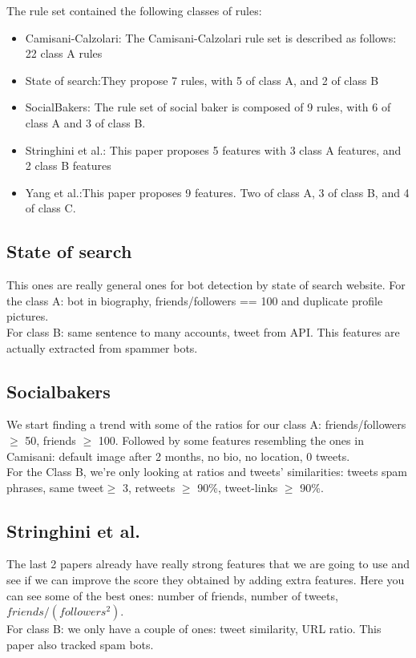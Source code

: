 \documentclass[a4paper,11pt]{article}
\begin{document}
The rule set contained the following classes of rules:

\begin{itemize}
\item Camisani-Calzolari: The Camisani-Calzolari rule set is described as follows: 22 class A rules
\item State of search:They propose 7 rules, with 5 of class A, and 2 of class B
\item SocialBakers: The rule set of social baker is composed of 9 rules, with 6 of class A and 3 of class B.
\item Stringhini et al.: This paper proposes 5 features with 3 class A features, and 2 class B features
\item Yang et al.:This paper proposes 9 features. Two of class A, 3 of class B, and 4 of class C.
\end{itemize}

\subsection{State of search}
This ones are really general ones for bot detection by state of search website.
For the class A: bot in biography, friends/followers == 100 and duplicate profile pictures.\\
For class B: same sentence to many accounts, tweet from API.
This features are actually extracted from spammer bots.

\subsection{Socialbakers}
We start finding a trend with some of the ratios for our class A: friends/followers $\geq$ 50, friends $\geq$ 100. Followed by some features resembling the ones in Camisani: default image after 2 months, no bio, no location, 0 tweets.\\
For the Class B, we're only looking at ratios and tweets' similarities: tweets spam phrases, same tweet$\geq$ 3, retweets $\geq$ 90\%, tweet-links $\geq$ 90\%.
\subsection{Stringhini et al.}
The last 2 papers already have really strong features that we are going to use and see if we can improve the score they obtained by adding extra features.
Here you can see some of the best ones: number of friends, number of tweets, $friends/(followers^2)$.\\
For class B: we only have a couple of ones: tweet similarity, URL ratio.
This paper also tracked spam bots.
\end{document}
